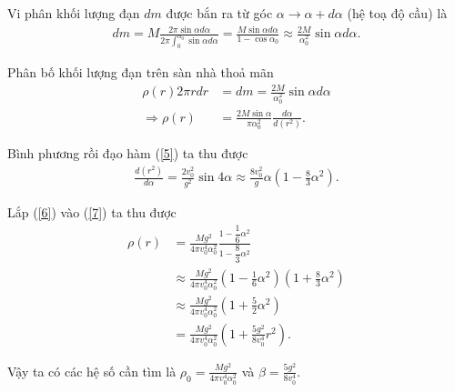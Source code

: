 Vi phân khối lượng đạn $dm$ được bắn ra từ góc $\alpha \rightarrow \alpha + d\alpha$ (hệ toạ độ cầu) là 
\begin{align}
    dm = M \frac{2 \pi \sin \alpha d\alpha}{\displaystyle 2 \pi \int_0^{\alpha_0} \sin \alpha d\alpha} = \frac{M \sin \alpha d\alpha}{1 - \cos \alpha_0} \approx \frac{2M}{\alpha_0^2} \sin \alpha d\alpha. \label{12}
\end{align}

Phân bố khối lượng đạn trên sàn nhà thoả mãn
\begin{align}
    \rho (r) 2 \pi r dr &= dm = \frac{2M}{\alpha_0^2} \sin \alpha d\alpha\\
 \Rightarrow   \rho(r) &= \frac{2M \sin \alpha}{\pi \alpha_0^2} \frac{d\alpha}{d(r^2)}.\label{7}
\end{align}

Bình phương rồi đạo hàm (\ref{5}) ta thu được 
\begin{align}
    \frac{d(r^2)}{d\alpha} = \frac{2v_0^2}{g^2} \sin 4 \alpha \approx \frac{8v_0^2}{g} \alpha \left(1 - \frac{8}{3} \alpha^2 \right).\label{6}
\end{align}

Lắp (\ref{6}) vào (\ref{7}) ta thu được 
\begin{align}
    \rho(r) &= \frac{M g^2}{4 \pi v_0^4 \alpha_0^2} \frac{1 - \dfrac{1}{6}\alpha^2}{1 - \dfrac{8}{3}\alpha^2}\\
    &\approx  \frac{M g^2}{4 \pi v_0^4 \alpha_0^2} \left( 1 - \frac{1}{6}\alpha^2\right) \left( 1 + \frac{8}{3}\alpha^2\right)\\
    & \approx  \frac{M g^2}{4 \pi v_0^4 \alpha_0^2} \left( 1 + \frac{5}{2} \alpha^2 \right)\\
    & =  \frac{M g^2}{4 \pi v_0^4 \alpha_0^2} \left( 1 + \frac{5g^2}{8 v_0^4} r^2 \right).
\end{align}

Vậy ta có các hệ số cần tìm là $\displaystyle \rho_0 =  \frac{M g^2}{4 \pi v_0^4 \alpha_0^2}$ và $\displaystyle \beta = \frac{5g^2}{8 v_0^4}$.

\vspace{2mm}

